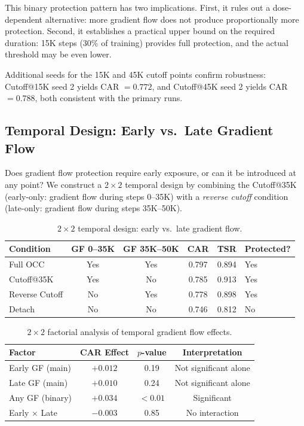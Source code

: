 \documentclass[letterpaper]{article}
\begin{document}
This binary protection pattern has two implications. First, it rules out a dose-dependent alternative: more gradient flow does not produce proportionally more protection. Second, it establishes a practical upper bound on the required duration: 15K steps (30\% of training) provides full protection, and the actual threshold may be even lower.

Additional seeds for the 15K and 45K cutoff points confirm robustness: Cutoff@15K seed 2 yields CAR $= 0.772$, and Cutoff@45K seed 2 yields CAR $= 0.788$, both consistent with the primary runs.

\subsection{Temporal Design: Early vs.\ Late Gradient Flow}
\label{sec:exp-temporal}

Does gradient flow protection require early exposure, or can it be introduced at any point? We construct a $2 \times 2$ temporal design by combining the Cutoff@35K (early-only: gradient flow during steps 0--35K) with a \emph{reverse cutoff} condition (late-only: gradient flow during steps 35K--50K).

\begin{table}[h]
\centering
\caption{$2 \times 2$ temporal design: early vs.\ late gradient flow.}
\label{tab:temporal}
\begin{tabular}{lccccl}
\toprule
Condition & GF 0--35K & GF 35K--50K & CAR & TSR & Protected? \\
\midrule
Full OCC       & Yes & Yes & 0.797 & 0.894 & Yes \\
Cutoff@35K     & Yes & No  & 0.785 & 0.913 & Yes \\
Reverse Cutoff & No  & Yes & 0.778 & 0.898 & Yes \\
Detach         & No  & No  & 0.746 & 0.812 & No  \\
\bottomrule
\end{tabular}
\end{table}

\begin{table}[h]
\centering
\caption{$2 \times 2$ factorial analysis of temporal gradient flow effects.}
\label{tab:factorial}
\begin{tabular}{lccc}
\toprule
Factor & CAR Effect & $p$-value & Interpretation \\
\midrule
Early GF (main)        & $+0.012$ & 0.19    & Not significant alone \\
Late GF (main)         & $+0.010$ & 0.24    & Not significant alone \\
Any GF (binary)        & $+0.034$ & $<0.01$ & Significant \\
Early $\times$ Late    & $-0.003$ & 0.85    & No interaction \\
\bottomrule
\end{tabular}
\end{table}
\end{document}
